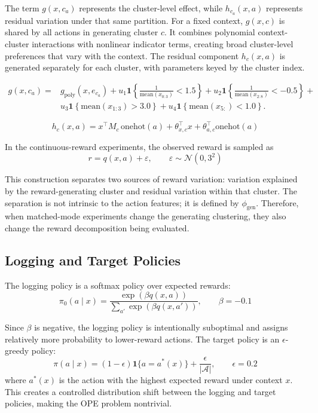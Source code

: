 \documentclass[11pt]{article}
\begin{document}

The term $g(x,c_a)$ represents the cluster-level effect, while $h_{c_a}(x,a)$ represents residual variation under that same partition. For a fixed context, $g(x,c)$ is shared by all actions in generating cluster $c$. It combines polynomial context-cluster interactions with nonlinear indicator terms, creating broad cluster-level preferences that vary with the context. The residual component $h_c(x,a)$ is generated separately for each cluster, with parameters keyed by the cluster index. 

\begin{equation*}
\begin{aligned}
g(x,c_a) ={}& g_{\mathrm{poly}}(x, e_{c_a}) + u_1 \mathbf{1}\left\{\frac{1}{\mathrm{mean}(x_{0:3})} < 1.5\right\} + u_2 \mathbf{1}\left\{ \frac{1}{\mathrm{mean}(x_{2:8})} < -0.5 \right\} + \\
& u_3 \mathbf{1}\left\{\mathrm{mean}(x_{1:3}) > 3.0 \right\} + u_4 \mathbf{1}\left\{\mathrm{mean}(x_{5:}) < 1.0 \right\}.
\end{aligned}
\end{equation*}

$$ h_c(x,a) = x^\top M_c \,\mathrm{onehot}(a) + \theta_{x,c}^\top x + \theta_{a,c}^\top \mathrm{onehot}(a)$$

In the continuous-reward experiments, the observed reward is sampled as
$$r=q(x,a)+\varepsilon, \qquad \varepsilon\sim\mathcal{N}(0,3^2)$$

This construction separates two sources of reward variation: variation explained by the reward-generating cluster and residual variation within that cluster. The separation is not intrinsic to the action features; it is defined by
\(\phi_{\mathrm{gen}}\). Therefore, when matched-mode experiments change the generating clustering, they also change the reward decomposition being evaluated.

\subsection{Logging and Target Policies}
The logging policy is a softmax policy over expected rewards:
$$ \pi_0(a\mid x) = \frac{\exp(\beta q(x,a))} {\sum_{a'}\exp(\beta q(x,a'))}, \qquad \beta=-0.1$$

Since $\beta$ is negative, the logging policy is intentionally suboptimal and assigns relatively more probability to lower-reward actions. The target policy is an $\epsilon$-greedy policy:
$$ \pi(a\mid x) = (1-\epsilon)\mathbf{1}\{a=a^*(x)\} + \frac{\epsilon}{|\mathcal{A}|}, \qquad \epsilon=0.2$$
where $a^*(x)$ is the action with the highest expected reward under context $x$. This creates a controlled distribution shift between the logging and target policies, making the OPE problem nontrivial.
\end{document}
